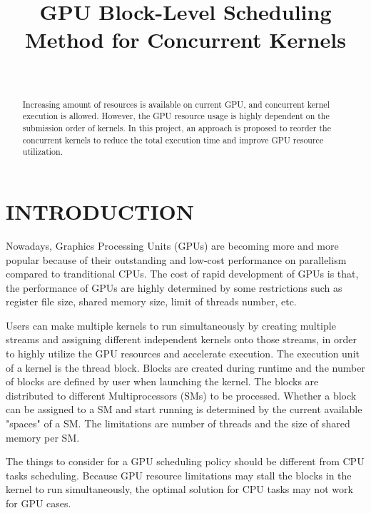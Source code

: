 \documentclass[12pt,journal,compsoc]{IEEEtran}
\begin{document}
\title{\LARGE \bf GPU Block-Level Scheduling Method for Concurrent Kernels}

\author{ \\
}

\maketitle

\begin{abstract}
Increasing amount of resources is available on current GPU, and concurrent kernel execution is allowed. However, the GPU resource usage is highly dependent on the submission order of kernels. In this project, an approach is proposed to reorder the concurrent kernels to reduce the total execution time and improve GPU resource utilization. 
\end{abstract}


\section{INTRODUCTION}
Nowadays, Graphics Processing Units (GPUs) are becoming more and more popular because of their outstanding and low-cost performance on parallelism compared to tranditional CPUs. The cost of rapid development of GPUs is that, the performance of GPUs are highly determined by some restrictions such as register file size, shared memory size, limit of threads number, etc. 

Users can make multiple kernels to run simultaneously by creating multiple streams and assigning different independent kernels onto those streams, in order to highly utilize the GPU resources and accelerate execution. The execution unit of a kernel is the thread block. Blocks are created during runtime and the number of blocks are defined by user when launching the kernel. The blocks are distributed to different Multiprocessors (SMs) to be processed. Whether a block can be assigned to a SM and start running is determined by the current available "spaces" of a SM. The limitations are number of threads and the size of shared memory per SM.

The things to consider for a GPU scheduling policy should be different from CPU tasks scheduling. Because GPU resource limitations may stall the blocks in the kernel to run simultaneously, the optimal solution for CPU tasks may not work for GPU cases.
\end{document}
